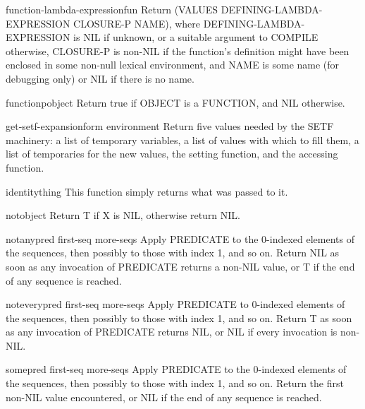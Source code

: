 \begin{function}{function-lambda-expression}{fun}{}{}
  Return (VALUES DEFINING-LAMBDA-EXPRESSION CLOSURE-P NAME), where
  DEFINING-LAMBDA-EXPRESSION is NIL if unknown, or a suitable argument
  to COMPILE otherwise, CLOSURE-P is non-NIL if the function's definition
  might have been enclosed in some non-null lexical environment, and
  NAME is some name (for debugging only) or NIL if there is no name.
\end{function}

\begin{function}{functionp}{object}{}{}
  Return true if OBJECT is a FUNCTION, and NIL otherwise.
\end{function}

\begin{function}{get-setf-expansion}{form \op environment}{}{}
  Return five values needed by the SETF machinery: a list of temporary
   variables, a list of values with which to fill them, a list of temporaries
   for the new values, the setting function, and the accessing function.
\end{function}

\begin{function}{identity}{thing}{}{}
  This function simply returns what was passed to it.
\end{function}

\begin{function}{not}{object}{}{}
  Return T if X is NIL, otherwise return NIL.
\end{function}

\begin{function}{notany}{pred first-seq \rest more-seqs}{}{}
  Apply PREDICATE to the 0-indexed elements of the sequences, then
   possibly to those with index 1, and so on. Return NIL as soon
   as any invocation of PREDICATE returns a non-NIL value, or T if the end
   of any sequence is reached.
\end{function}

\begin{function}{notevery}{pred first-seq \rest more-seqs}{}{}
  Apply PREDICATE to 0-indexed elements of the sequences, then
   possibly to those with index 1, and so on. Return T as soon
   as any invocation of PREDICATE returns NIL, or NIL if every invocation
   is non-NIL.
\end{function}

\begin{function}{some}{pred first-seq \rest more-seqs}{}{}
  Apply PREDICATE to the 0-indexed elements of the sequences, then
   possibly to those with index 1, and so on. Return the first
   non-NIL value encountered, or NIL if the end of any sequence is reached.
\end{function}

